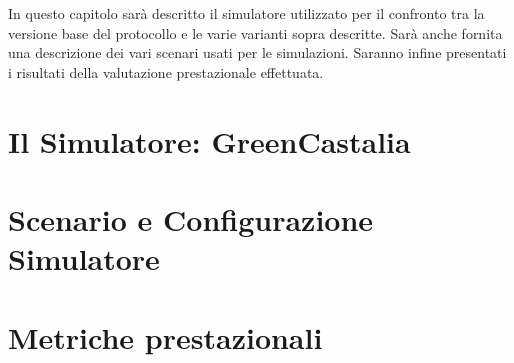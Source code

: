 In questo capitolo sarà descritto il simulatore utilizzato per il confronto tra la versione base del protocollo e le varie varianti sopra descritte. Sarà anche fornita una descrizione dei vari scenari usati per le simulazioni. Saranno infine presentati i risultati della valutazione prestazionale effettuata.

\section{Il Simulatore: GreenCastalia}


\section{Scenario e Configurazione Simulatore}


\section{Metriche prestazionali}
